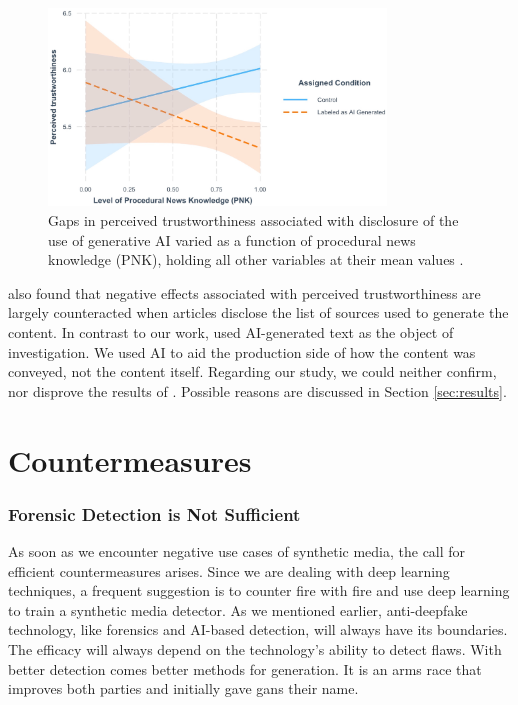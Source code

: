 \documentclass[
  a4paper,  %
  twoside,  %
  bibliography=totoc,
  headsepline,
  cleardoublepage=empty,
  parskip=half,
  draft=false
]{scrbook}
\begin{document}
\begin{figure}[h]
  \centering
  \includegraphics[width=0.8\textwidth]{./graphics/toff/PNK.png}
  \caption{Gaps in perceived trustworthiness associated with disclosure of the use of generative AI varied as a function of procedural news knowledge (PNK), holding all other variables at their mean values \cite{toffTheyCouldJust2023}.}
  \label{fig:toff-PNK}
\end{figure}

\citeauthor{toffTheyCouldJust2023} also found that negative effects associated with perceived trustworthiness are largely counteracted when articles disclose the list of sources used to generate the content.
In contrast to our work, \citeauthor{toffTheyCouldJust2023} used AI-generated text as the object of investigation. We used AI to aid the production side of how the content was conveyed, not the content itself. Regarding our study, we could neither confirm, nor disprove the results of \citet{toffTheyCouldJust2023}. Possible reasons are discussed in Section \ref{sec:results}.

\section{Countermeasures}
\label{sec:rel-work-counteringdf}
\subsubsection*{Forensic Detection is Not Sufficient}
As soon as we encounter negative use cases of synthetic media, the call for efficient countermeasures arises. Since we are dealing with deep learning techniques, a frequent suggestion is to counter fire with fire and use deep learning to train a synthetic media detector. As we mentioned earlier, anti-deepfake technology, like forensics and AI-based detection, will always have its boundaries. The efficacy will always depend on the technology's ability to detect flaws. With better detection comes better methods for generation. It is an arms race that improves both parties and initially gave \gls{gan}s their name.
\end{document}

